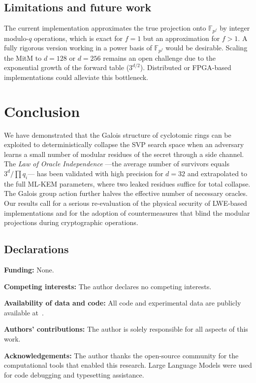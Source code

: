 \documentclass[12pt,a4paper]{article}
\begin{document}
\subsection{Limitations and future work}
The current implementation approximates the true projection onto $\mathbb{F}_{p^f}$ by integer modulo-$q$ operations, which is exact for $f=1$ but an approximation for $f>1$. A fully rigorous version working in a power basis of $\mathbb{F}_{p^f}$ would be desirable. Scaling the MitM to $d=128$ or $d=256$ remains an open challenge due to the exponential growth of the forward table ($3^{d/2}$). Distributed or FPGA-based implementations could alleviate this bottleneck.

\section{Conclusion}
\label{sec:conclusion}

We have demonstrated that the Galois structure of cyclotomic rings can be exploited to deterministically collapse the SVP search space when an adversary learns a small number of modular residues of the secret through a side channel. The \emph{Law of Oracle Independence} —the average number of survivors equals $3^d / \prod q_i$— has been validated with high precision for $d=32$ and extrapolated to the full ML-KEM parameters, where two leaked residues suffice for total collapse. The Galois group action further halves the effective number of necessary oracles. Our results call for a serious re-evaluation of the physical security of LWE-based implementations and for the adoption of countermeasures that blind the modular projections during cryptographic operations.

\subsection*{Declarations}
\textbf{Funding:} None.

\textbf{Competing interests:} The author declares no competing interests.

\textbf{Availability of data and code:} All code and experimental data are publicly available at~\cite{Peinador2026Repo}.

\textbf{Authors' contributions:} The author is solely responsible for all aspects of this work.

\textbf{Acknowledgements:} The author thanks the open-source community for the computational tools that enabled this research. Large Language Models were used for code debugging and typesetting assistance.
\end{document}
